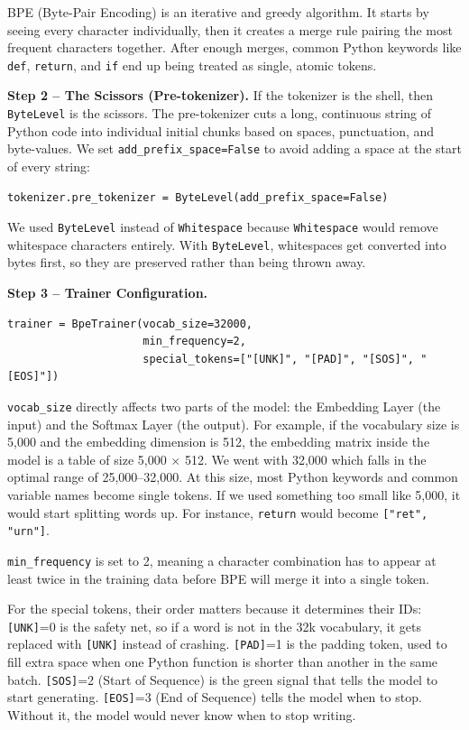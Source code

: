 \documentclass[11pt]{article}
\begin{document}
BPE (Byte-Pair Encoding) is an iterative and greedy algorithm. It starts by seeing every character individually, then it creates a merge rule pairing the most frequent characters together. After enough merges, common Python keywords like \texttt{def}, \texttt{return}, and \texttt{if} end up being treated as single, atomic tokens.

\textbf{Step 2 -- The Scissors (Pre-tokenizer).} If the tokenizer is the shell, then \texttt{ByteLevel} is the scissors. The pre-tokenizer cuts a long, continuous string of Python code into individual initial chunks based on spaces, punctuation, and byte-values. We set \texttt{add\_prefix\_space=False} to avoid adding a space at the start of every string:

\begin{lstlisting}[style=python]
tokenizer.pre_tokenizer = ByteLevel(add_prefix_space=False)
\end{lstlisting}

We used \texttt{ByteLevel} instead of \texttt{Whitespace} because \texttt{Whitespace} would remove whitespace characters entirely. With \texttt{ByteLevel}, whitespaces get converted into bytes first, so they are preserved rather than being thrown away.

\textbf{Step 3 -- Trainer Configuration.}

\begin{lstlisting}[style=python]
trainer = BpeTrainer(vocab_size=32000,
                     min_frequency=2,
                     special_tokens=["[UNK]", "[PAD]", "[SOS]", "[EOS]"])
\end{lstlisting}

\texttt{vocab\_size} directly affects two parts of the model: the Embedding Layer (the input) and the Softmax Layer (the output). For example, if the vocabulary size is 5,000 and the embedding dimension is 512, the embedding matrix inside the model is a table of size 5,000 $\times$ 512. We went with 32,000 which falls in the optimal range of 25,000--32,000. At this size, most Python keywords and common variable names become single tokens. If we used something too small like 5,000, it would start splitting words up. For instance, \texttt{return} would become \texttt{["ret", "urn"]}.

\texttt{min\_frequency} is set to 2, meaning a character combination has to appear at least twice in the training data before BPE will merge it into a single token.

For the special tokens, their order matters because it determines their IDs: \texttt{[UNK]}=0 is the safety net, so if a word is not in the 32k vocabulary, it gets replaced with \texttt{[UNK]} instead of crashing. \texttt{[PAD]}=1 is the padding token, used to fill extra space when one Python function is shorter than another in the same batch. \texttt{[SOS]}=2 (Start of Sequence) is the green signal that tells the model to start generating. \texttt{[EOS]}=3 (End of Sequence) tells the model when to stop. Without it, the model would never know when to stop writing.
\end{document}
